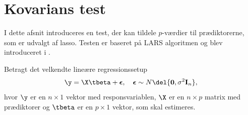 \section{Kovarians test} \label{subsec:kovarians_test}
I dette afsnit introduceres en test, der kan tildele \(p\)-værdier til prædiktorerne, som er udvalgt af lasso.
Testen er baseret på LARS algoritmen og blev introduceret i \citep{lockhart}.

Betragt det velkendte lineære regressionssetup
\begin{align}
\y = \X \tbeta + \boldsymbol{\epsilon}, \quad \boldsymbol{\epsilon} \sim N\del{\mathbf{0}, \sigma^2 \mathbf{I}_n}, \label{eq:set-up}
\end{align}
hvor \(\y\) er en \(n \times 1\) vektor med responsvariablen, \(\X\) er en \(n \times p\) matrix med prædiktorer og \(\tbeta\) er en \(p \times 1\) vektor, som skal estimeres.

